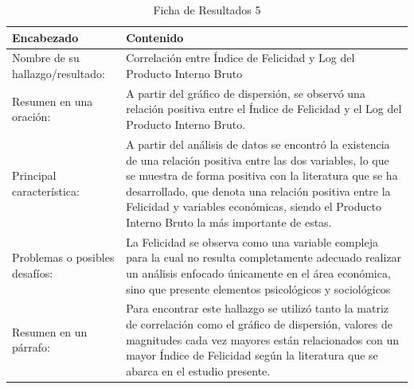 \begin{table}[H]
    \caption{Ficha de Resultados 5}
    \begin{center}
        \begin{tabular}{  m{3cm} | m{12cm}  }
        \hline\textbf{ Encabezado} & \textbf{Contenido }\\ \hline
        Nombre de su hallazgo/resultado: &  Correlación entre Índice de Felicidad y Log del Producto Interno Bruto\\ \hline
        Resumen en una oración: &  A partir del gráfico de dispersión, se observó una relación positiva  entre el Índice de Felicidad y el Log del Producto Interno Bruto. \\ \hline
        Principal característica: &  A partir del análisis de datos se encontró la existencia de una relación positiva entre las dos variables, lo que se muestra de forma positiva con la literatura que se ha desarrollado, que denota una relación positiva entre la Felicidad y variables económicas, siendo el Producto Interno Bruto la más importante de estas.\\ \hline
        Problemas o posibles desafíos: &  La Felicidad se observa como una variable compleja para la cual no resulta completamente adecuado realizar un análisis enfocado únicamente en el área económica, sino que presente elementos psicológicos y sociológicos \\ \hline
        Resumen en un párrafo: & Para encontrar este hallazgo se utilizó tanto la matriz de correlación como el gráfico de dispersión, valores de magnitudes cada vez mayores están relacionados con un mayor Índice de Felicidad según la literatura que se abarca en el estudio presente. \\ \hline
        \end{tabular}
    \end{center}
\end{table}
